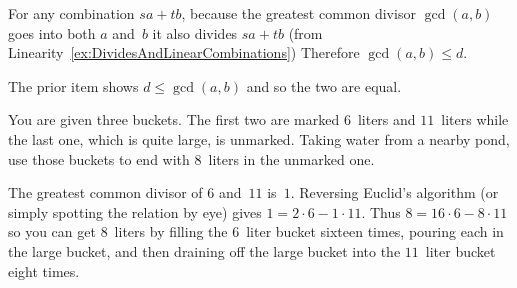 \documentclass{ibl}  %
\begin{document}
\begin{bezoutproof}
\begin{ex}
\begin{ans}
\begin{exes}
  For any combination $sa+tb$, because the greatest common divisor
  $\gcd(a,b)$ goes into both $a$ and~$b$ it also divides $sa+tb$  
  (from Linearity~\ref{ex:DividesAndLinearCombinations})
  Therefore $\gcd(a,b)\leq d$.

  The prior item shows $d\leq\gcd(a,b)$ and so the two are equal. 





\end{exes}
\end{ans}
\end{ex}

\begin{ex}
You are given three buckets. 
The first two are marked $6$~liters and $11$~liters
while the last one, which is quite large, is unmarked.
Taking water from a nearby pond, use those buckets
to end with $8$~liters in the unmarked one.  
\begin{ans}
The greatest common divisor of $6$ and~$11$ is~$1$.
Reversing Euclid's algorithm (or simply spotting the relation by eye) 
gives $1=2\cdot 6-1\cdot 11$.
Thus $8=16\cdot 6- 8\cdot 11$
so you can get $8$~liters by filling 
the $6$~liter bucket sixteen times, pouring each in the 
large bucket, and then draining off the large bucket into the
$11$~liter bucket eight times.


\end{ans}
\end{ex}
\end{bezoutproof}
\end{document}
